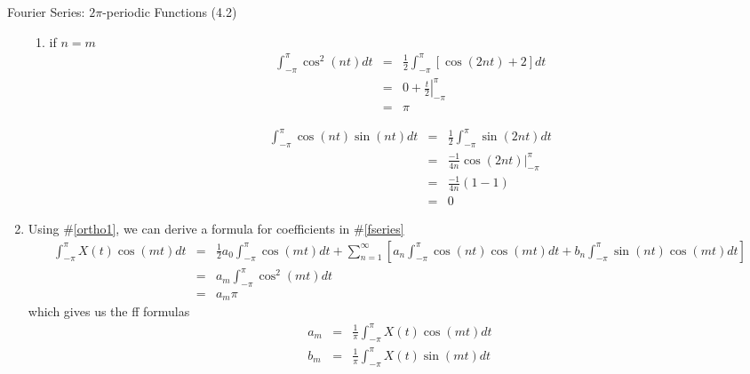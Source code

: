 \documentclass{article}
\newcommand{\intpi}{\int_{-\pi}^{\pi}}
\begin{document}
\begin{section}{Fourier Series: $2\pi$-periodic Functions (4.2)}
\begin{enumerate}
\begin{enumerate}
    \item if $n = m$
    \begin{eqnarray}
    \intpi \cos^{2}(nt) dt & = & \frac{1}{2} \intpi [\cos(2nt) + 2] dt 
                                                    \nonumber \\
    & = & 0 + \left. \frac{t}{2} \right|_{-\pi}^{\pi} \nonumber\\
    & = & \pi \nonumber
    \end{eqnarray}

    \begin{eqnarray}
    \intpi \cos(nt)\sin(nt) dt & = & \frac{1}{2} \intpi \sin(2nt) dt\nonumber\\
     & = & \frac{-1}{4n} \left. \cos(2nt) \right|_{-\pi}^{\pi} \nonumber\\
     & = & \frac{-1}{4n} (1 - 1) \nonumber\\
     & = & 0 \nonumber
    \end{eqnarray}

    \end{enumerate}
\item Using \#\ref{ortho1}, we can derive a formula for coefficients in 
  \#\ref{fseries}
  \begin{eqnarray}
  \intpi X(t) \cos(mt) dt & = & \frac{1}{2} a_{0} \intpi \cos(mt) dt +
      \sum_{n=1}^{\infty} [a_{n} \intpi \cos(nt)\cos(mt) dt + 
                           b_{n} \intpi \sin(nt)\cos(mt) dt ] \nonumber\\
   & = & a_{m} \intpi \cos^{2}(mt) dt \nonumber\\
   & = & a_{m} \pi \nonumber
  \end{eqnarray}
  \noindent which gives us the ff formulas
  \begin{eqnarray}
  a_{m} & = & \frac{1}{\pi} \intpi X(t) \cos(mt) dt \nonumber\\
  b_{m} & = & \frac{1}{\pi} \intpi X(t) \sin(mt) dt \nonumber
  \end{eqnarray}
\end{enumerate}
\end{section}
\end{document}

